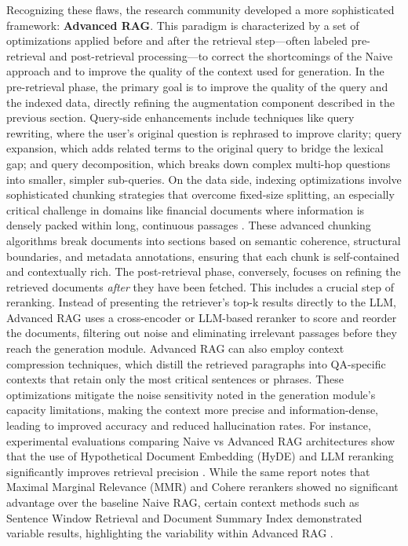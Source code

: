 \documentclass[11pt]{article}
\begin{document}
Recognizing these flaws, the research community developed a more sophisticated framework: \textbf{Advanced RAG}. This paradigm is characterized by a set of optimizations applied before and after the retrieval step---often labeled pre-retrieval and post-retrieval processing---to correct the shortcomings of the Naive approach \cite{ref1} and to improve the quality of the context used for generation. In the pre-retrieval phase, the primary goal is to improve the quality of the query and the indexed data, directly refining the augmentation component described in the previous section. Query-side enhancements include techniques like query rewriting, where the user's original question is rephrased to improve clarity; query expansion, which adds related terms to the original query to bridge the lexical gap; and query decomposition, which breaks down complex multi-hop questions into smaller, simpler sub-queries. On the data side, indexing optimizations involve sophisticated chunking strategies that overcome fixed-size splitting, an especially critical challenge in domains like financial documents where information is densely packed within long, continuous passages \cite{ref3}. These advanced chunking algorithms break documents into sections based on semantic coherence, structural boundaries, and metadata annotations, ensuring that each chunk is self-contained and contextually rich. The post-retrieval phase, conversely, focuses on refining the retrieved documents \emph{after} they have been fetched. This includes a crucial step of reranking. Instead of presenting the retriever's top-k results directly to the LLM, Advanced RAG uses a cross-encoder or LLM-based reranker to score and reorder the documents, filtering out noise and eliminating irrelevant passages before they reach the generation module. Advanced RAG can also employ context compression techniques, which distill the retrieved paragraphs into QA-specific contexts that retain only the most critical sentences or phrases. These optimizations mitigate the noise sensitivity noted in the generation module's capacity limitations, making the context more precise and information-dense, leading to improved accuracy and reduced hallucination rates. For instance, experimental evaluations comparing Naive vs Advanced RAG architectures show that the use of Hypothetical Document Embedding (HyDE) and LLM reranking significantly improves retrieval precision \cite{ref4}. While the same report notes that Maximal Marginal Relevance (MMR) and Cohere rerankers showed no significant advantage over the baseline Naive RAG, certain context methods such as Sentence Window Retrieval and Document Summary Index demonstrated variable results, highlighting the variability within Advanced RAG \cite{ref4}.
\end{document}
